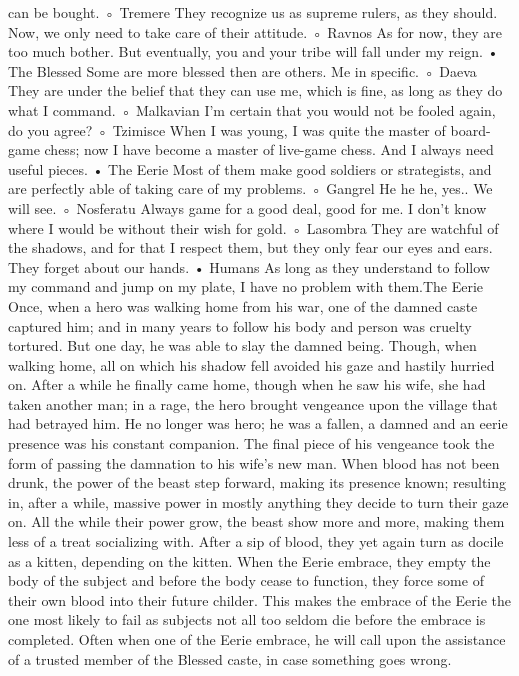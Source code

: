 \documentclass[10pt,a4paper]{article}
\begin{document}
can be bought.
◦ Tremere
They recognize us as supreme rulers, as they should. Now, we
only need to take care of their attitude.
◦ Ravnos
As for now, they are too much bother. But eventually, you and
your tribe will fall under my reign.
• The Blessed
Some are more blessed then are others. Me in specific.
◦ Daeva
They are under the belief that they can use me, which is fine, as
long as they do what I command.
◦ Malkavian
I'm certain that you would not be fooled again, do you agree?
◦ Tzimisce
When I was young, I was quite the master of board-game chess;
now I have become a master of live-game chess. And I always
need useful pieces.
• The Eerie
Most of them make good soldiers or strategists, and are perfectly
able of taking care of my problems.
◦ Gangrel
He he he, yes.. We will see.
◦ Nosferatu
Always game for a good deal, good for me. I don't know where I
would be without their wish for gold.
◦ Lasombra
They are watchful of the shadows, and for that I respect them,
but they only fear our eyes and ears. They forget about our
hands.
• Humans
As long as they understand to follow my command and jump on my
plate, I have no problem with them.The Eerie
Once, when a hero was walking home from his war, one of the damned
caste captured him; and in many years to follow his body and person was
cruelty tortured. But one day, he was able to slay the damned being.
Though, when walking home, all on which his shadow fell avoided his gaze
and hastily hurried on. After a while he finally came home, though when he
saw his wife, she had taken another man; in a rage, the hero brought
vengeance upon the village that had betrayed him. He no longer was hero;
he was a fallen, a damned and an eerie presence was his constant
companion. The final piece of his vengeance took the form of passing the
damnation to his wife's new man.
When blood has not been drunk, the power of the beast step forward,
making its presence known; resulting in, after a while, massive power in
mostly anything they decide to turn their gaze on. All the while their power
grow, the beast show more and more, making them less of a treat socializing
with. After a sip of blood, they yet again turn as docile as a kitten,
depending on the kitten.
When the Eerie embrace, they empty the body of the subject and before the
body cease to function, they force some of their own blood into their future
childer. This makes the embrace of the Eerie the one most likely to fail as
subjects not all too seldom die before the embrace is completed. Often when
one of the Eerie embrace, he will call upon the assistance of a trusted
member of the Blessed caste, in case something goes wrong.
\end{document}
